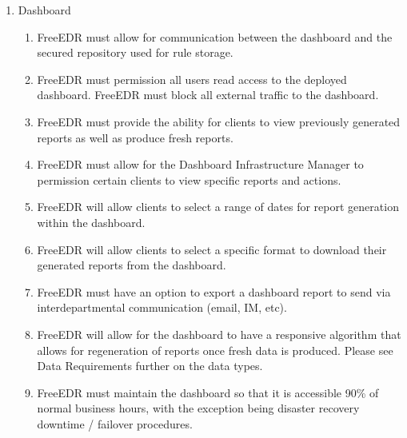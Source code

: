 \documentclass{scrreprt}
\begin{document}
\begin{enumerate}[resume*]
    \item Dashboard
    \begin{enumerate}[label*=\arabic*.]
        \item  FreeEDR must allow for communication between the dashboard and the secured repository used for rule storage.
	\item FreeEDR must permission all users read access to the deployed dashboard. FreeEDR must block all external traffic to the dashboard.
\item FreeEDR must provide the ability for clients to view previously generated reports as well as produce fresh reports.
\item FreeEDR must allow for the Dashboard Infrastructure Manager to permission certain clients to view specific reports and actions. 
\item FreeEDR will allow clients to select a range of dates for report generation within the dashboard.
\item FreeEDR will allow clients to select a specific format to download their generated reports from the dashboard.
\item FreeEDR must have an option to export a dashboard report to send via interdepartmental communication (email, IM, etc).
\item FreeEDR will allow for the dashboard to have a responsive algorithm that allows for regeneration of reports once fresh data is produced. Please see Data Requirements further on the data types.
\item FreeEDR must maintain the dashboard so that it is accessible 90\% of normal business hours, with the exception being disaster recovery downtime / failover procedures.
    \end{enumerate}
\end{enumerate}
\end{document}
